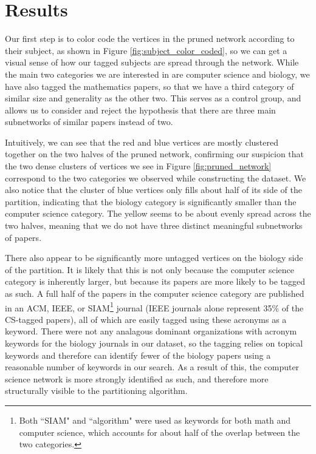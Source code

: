 \documentclass[12pt]{thesis}
\theoremstyle{plain}
\theoremstyle{definition}
\theoremstyle{remark}
\begin{document}
\section{Results}

Our first step is to color code the vertices in the pruned network according to their subject, as shown in Figure \ref{fig:subject_color_coded}, so we can get a visual sense of how our tagged subjects are spread through the network. While the main two categories we are interested in are computer science and biology, we have also tagged the mathematics papers, so that we have a third category of similar size and generality as the other two. This serves as a control group, and allows us to consider and reject the hypothesis that there are three main subnetworks of similar papers instead of two. 

Intuitively, we can see that the red and blue vertices are mostly clustered together on the two halves of the pruned network, confirming our suspicion that the two dense clusters of vertices we see in Figure \ref{fig:pruned_network} correspond to the two categories we observed while constructing the dataset. We also notice that the cluster of blue vertices only fills about half of its side of the partition, indicating that the biology category is significantly smaller than the computer science category. The yellow seems to be about evenly spread across the two halves, meaning that we do not have three distinct meaningful subnetworks of papers. 

There also appear to be significantly more untagged vertices on the biology side of the partition. It is likely that this is not only because the computer science category is inherently larger, but because its papers are more likely to be tagged as such. A full half of the papers in the computer science category are published in an ACM, IEEE, or SIAM\footnote{Both ``SIAM" and ``algorithm" were used as keywords for both math and computer science, which accounts for about half of the overlap between the two categories.} journal (IEEE journals alone represent 35\% of the CS-tagged papers), all of which are easily tagged using these acronyms as a keyword. There were not any analagous dominant organizations with acronym keywords for the biology journals in our dataset, so the tagging relies on topical keywords and therefore can identify fewer of the biology papers using a reasonable number of keywords in our search. As a result of this, the computer science network is more strongly identified as such, and therefore more structurally visible to the partitioning algorithm.
\end{document}
